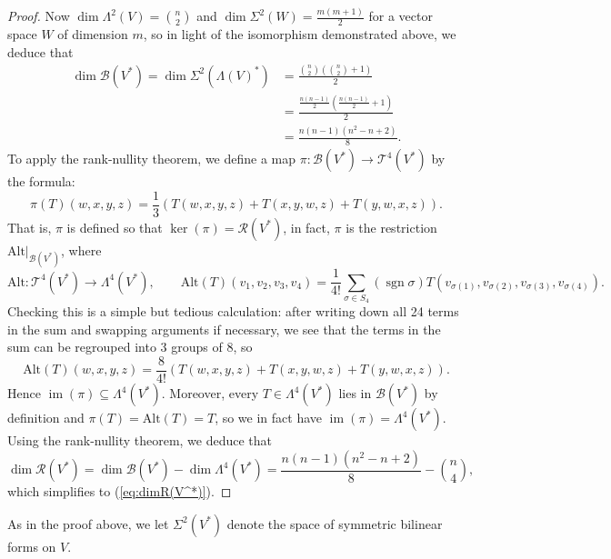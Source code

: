 \documentclass{amsart}
\numberwithin{equation}{section}
\def\~#1{\mathscr{#1}}
\newcommand{\im}{\mathop{\mathrm{im}}}
\newcommand{\Alt}{\mathrm{Alt}}
\newcommand{\sgn}{\mathop{\mathrm{sgn}}}
\theoremstyle{plain}
\theoremstyle{definition}
\theoremstyle{remark}
\begin{document}
\begin{proof}
Now $\dim \Lambda^2(V) = \binom{n}{2}$ and $\dim \Sigma^2(W) = \frac{m(m+1)}{2}$ for a vector space $W$ of dimension $m$, so in light of the isomorphism demonstrated above, we deduce that
\begin{align*}
    \dim \~B(V^*) = \dim \Sigma^2(\Lambda(V)^*) &= \frac{\binom{n}{2}\left(\binom{n}{2} + 1\right)}{2}\\
    &= \frac{\frac{n(n-1)}{2}\left(\frac{n(n-1)}{2} + 1\right)}{2}\\
    &= \frac{n(n-1)(n^2 - n + 2)}{8}.
\end{align*}
To apply the rank-nullity theorem, we define a map $\pi : \~B(V^*) \to \~T^4(V^*)$ by the formula:
\[\pi(T)(w, x, y, z) = \frac{1}{3} \left(T(w, x, y, z) + T(x,y,w,z) + T(y,w,x,z)\right).\]
That is, $\pi$ is defined so that $\ker(\pi) = \~R(V^*)$, in fact, $\pi$ is the restriction $\Alt|_{\~B(V^*)}$, where
\[\Alt: \~T^4(V^*) \to \Lambda^4(V^*), \qquad \Alt(T)(v_1, v_2, v_3, v_4) = \frac{1}{4!} \sum_{\sigma \in S_4}(\sgn{\sigma})T(v_{\sigma(1)}, v_{\sigma(2)},v_{\sigma(3)}, v_{\sigma(4)}).\]
Checking this is a simple but tedious calculation: after writing down all 24 terms in the sum and swapping arguments if necessary, we see that the terms in the sum can be regrouped into $3$ groups of $8$, so
\[\Alt(T)(w,x,y,z) = \frac{8}{4!} \left(T(w, x, y, z) + T(x,y,w,z) + T(y,w,x,z)\right).\]
Hence $\im(\pi) \subseteq \Lambda^4(V^*)$. Moreover, every $T \in \Lambda^4(V^*)$ lies in $\~B(V^*)$ by definition and $\pi(T) = \Alt(T) = T$, so we in fact have $\im(\pi)=\Lambda^4(V^*)$. Using the rank-nullity theorem, we deduce that
\[\dim\~R(V^*) = \dim \~B(V^*) - \dim \Lambda^4(V^*) = \frac{n(n-1)(n^2 - n + 2)}{8} - \binom{n}{4},\]
which simplifies to (\ref{eq:dimR(V^*)}).
\end{proof}

As in the proof above, we let $\Sigma^2(V^*)$ denote the space of symmetric bilinear forms on $V$.
\end{document}
